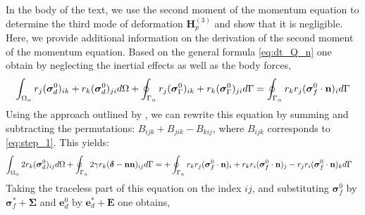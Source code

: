 In the body of the text, we use the second moment of the momentum equation to determine the third mode of deformation $\textbf{H}_p^{(3)}$ and show that it is negligible. 
Here, we provide additional information on the derivation of the second moment of the momentum equation. 
Based on the general formula \ref{eq:dt_Q_n} one obtain by neglecting the inertial effects  as well as the body forces,  
\begin{equation}
    \intO{ r_{j}(\bm{\sigma}^0_d)_{ik}+r_{k}(\bm{\sigma}^0_d)_{ji}}
    +\intS{ r_{j}(\bm{\sigma}^0_\Gamma)_{ik}+r_{k}(\bm{\sigma}_\Gamma^0)_{ji}}
    = 
    \intS{  r_{k}r_{j} (\bm{\sigma}_f^0\cdot\textbf{n})_i }
    \label{eq:step_1}
\end{equation}
Using the approach outlined by \citet{lhuillier1996contribution}, we can rewrite this equation by summing and subtracting the permutations:  $B_{ijk} + B_{jik} - B_{kij}$, where $B_{ijk}$ corresponds to \ref{eq:step_1}.
This yields:
\begin{align}
    \int_{\Omega_{\alpha}} 2 r_{k}(\bm{\sigma}^0_d)_{ij} d\Omega
    +\oint_{\Gamma_{\alpha}} 2\gamma r_{k}(\bm\delta - \textbf{nn})_{ij} d\Gamma
    &= 
    +\oint_{\Gamma_{\alpha}} 
        r_{k}r_{j} (\bm{\sigma}_f^0\cdot\textbf{n})_i 
        + r_{k}r_{i} (\bm{\sigma}_f^0\cdot\textbf{n})_j 
        - r_{j}r_{i} (\bm{\sigma}_f^0\cdot\textbf{n})_k 
     d\Gamma
\end{align}
Taking the traceless part of this equation on the index $ij$, and substituting $\bm\sigma_f^0$ by $\bm\sigma_f^* + \bm\Sigma$ and $\textbf{e}_d^0$ by $\textbf{e}_d^* + \textbf{E}$ one obtains, 
